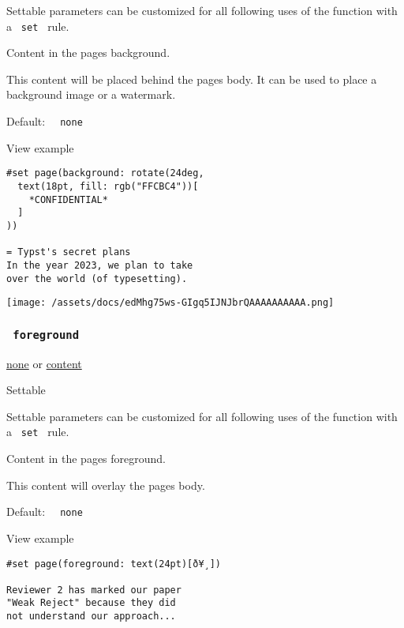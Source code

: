 \label{parameters-background-settable-tooltip}
Settable parameters can be customized for all following uses of the
function with a \texttt{\ set\ } rule.

Content in the page\textquotesingle s background.

This content will be placed behind the page\textquotesingle s body. It
can be used to place a background image or a watermark.

Default: \texttt{\ }{\texttt{\ none\ }}\texttt{\ }


View example

\begin{verbatim}
#set page(background: rotate(24deg,
  text(18pt, fill: rgb("FFCBC4"))[
    *CONFIDENTIAL*
  ]
))

= Typst's secret plans
In the year 2023, we plan to take
over the world (of typesetting).
\end{verbatim}

\texttt{[image: /assets/docs/edMhg75ws-GIgq5IJNJbrQAAAAAAAAAA.png]}

\subsubsection{\texorpdfstring{\texttt{\ foreground\ }}{ foreground }}\label{parameters-foreground}

\href{/docs/reference/foundations/none/}{none} {or}
\href{/docs/reference/foundations/content/}{content}

{{ Settable }}

\label{parameters-foreground-settable-tooltip}
Settable parameters can be customized for all following uses of the
function with a \texttt{\ set\ } rule.

Content in the page\textquotesingle s foreground.

This content will overlay the page\textquotesingle s body.

Default: \texttt{\ }{\texttt{\ none\ }}\texttt{\ }


View example

\begin{verbatim}
#set page(foreground: text(24pt)[ð¥¸])

Reviewer 2 has marked our paper
"Weak Reject" because they did
not understand our approach...
\end{verbatim}

